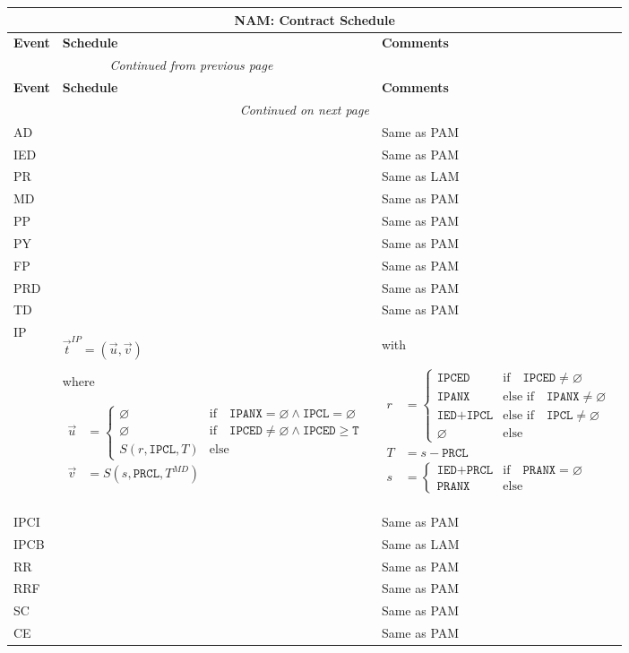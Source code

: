 \documentclass[9pt,oneside]{amsart}
\newenvironment{schedule}[1]{
	\hfill %
	\begin{longtable}{| p{0.05\textwidth} | p{0.5\textwidth} |  p{0.4\textwidth} |}
	\multicolumn{3}{c}{\textbf{#1: Contract Schedule}}\\
	\hline
	\textbf{Event} & \textbf{Schedule} & \textbf{Comments} \\
	\hline
	\endfirsthead
	\multicolumn{2}{c}{\textit{Continued from previous page}} \\
	\hline
	\textbf{Event} & \textbf{Schedule} & \textbf{Comments} \\
	\hline
	\endhead
	\hline \multicolumn{2}{r}{\textit{Continued on next page}} \\
	\endfoot
	\endlastfoot
}{%
	\hline
	\end{longtable}
}
\newcommand{\attr}[1]{\texttt{#1}}
\newcommand{\sdl}[3]{S(#1,#2,#3)}
\newcommand{\undef}{\varnothing}
\begin{document}
\begin{schedule}{NAM}
	AD & & Same as PAM \\
	\hline
	IED & & Same as PAM \\
	\hline
	PR & & Same as LAM \\
	\hline
	MD & & Same as PAM \\
	\hline
	PP & & Same as PAM \\
	\hline
	PY & & Same as PAM \\
	\hline
	FP & & Same as PAM \\
	\hline
	PRD & & Same as PAM \\
	\hline
	TD & & Same as PAM \\
	\hline
	IP & $\vec{t}^{IP} = (\vec{u},\vec{v})$ \par
		where \par
		{$\begin{aligned} \vec{u} &= \begin{cases} \undef & \text{if}\quad \attr{IPANX}=\undef\land\attr{IPCL}=\undef \\
							\undef & \text{if}\quad \attr{IPCED}\neq\undef\land\attr{IPCED}\geq\attr{T}\\
							\sdl{r}{\attr{IPCL}}{T} & \text{else} \end{cases} \\
				\vec{v} &= \sdl{s}{\attr{PRCL}}{T^{MD}} \end{aligned}$}
		 & with\par {$\begin{aligned} r &= \begin{cases} \attr{IPCED} & \text{if}\quad \attr{IPCED}\neq\undef \\
								\attr{IPANX} & \text{else if}\quad \attr{IPANX}\neq\undef \\
								\attr{IED}+\attr{IPCL} & \text{else if}\quad \attr{IPCL}\neq\undef \\
								\undef & \text{else} \end{cases} \\
						T &= s-\attr{PRCL} \\
						s &= \begin{cases} \attr{IED}+\attr{PRCL} & \text{if} \quad \attr{PRANX} = \undef \\
					   \attr{PRANX} & \text{else} \end{cases} \end{aligned}$} \\
	\hline
	IPCI & & Same as PAM \\
  	\hline
	IPCB & & Same as LAM \\
	\hline
	RR & & Same as PAM \\
	\hline
	RRF & & Same as PAM \\
  	\hline
	SC & & Same as PAM \\
	\hline
	CE & & Same as PAM \\
\end{schedule}
\end{document}
